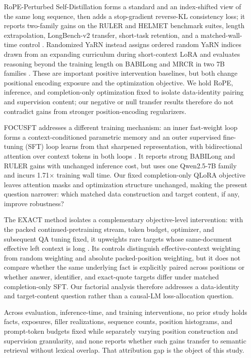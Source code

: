 \documentclass[11pt]{article}
\begin{document}
RoPE-Perturbed Self-Distillation forms a standard and an index-shifted view of the same long sequence, then adds a stop-gradient reverse-KL consistency loss; it reports two-family gains on the RULER and HELMET benchmark suites, length extrapolation, LongBench-v2 transfer, short-task retention, and a matched-wall-time control \citep{li2026shuffle}. Randomized YaRN instead assigns ordered random YaRN indices drawn from an expanding curriculum during short-context LoRA and evaluates reasoning beyond the training length on BABILong and MRCR in two 7B families \citep{mehta2026randomized}. These are important positive intervention baselines, but both change positional encoding exposure and the optimization objective. We hold RoPE, inference, and completion-only optimization fixed to isolate data-identity pairing and supervision content; our negative or null transfer results therefore do not contradict gains from stronger position-encoding regularizers.

FOCUSFT addresses a different training mechanism: an inner fast-weight loop forms a context-conditioned parametric memory and an outer supervised fine-tuning (SFT) loop learns from that sharpened representation, with bidirectional attention over context tokens in both loops \citep{pei2026focusft}. It reports strong BABILong and RULER gains with unchanged inference cost, but uses one Qwen2.5-7B family and incurs 1.71$\times$ training wall time. Our fixed completion-only QLoRA objective leaves attention masks and optimization structure unchanged, making the present question narrower: which matched data construction and target content, if any, improve robustness?

The EXACT method isolates a complementary objective-level intervention: with the packed continued-pretraining stream, token budget, optimizer, and subsequent QA tuning fixed, it upweights rare targets whose same-document effective left context is long \citep{zhu2026exact}. Its controls distinguish effective-context weighting from random weighting and absolute packed-position weighting, but it does not compare whether the same underlying fact is explicitly paired across positions or whether answer, identifier, and exact-quote targets differ under matched completion-only SFT. Our factorial analysis therefore addresses a data-identity and target-content question rather than a causal-LM loss-allocation question.

Across evaluation, inference-time, and training interventions, no prior study holds facts, exposures, filler realizations, sequence counts, position histograms, and prompt-token budgets fixed while separately varying position construction and supervision granularity, and none reports whether such gains transfer to semantic retrieval without lexical overlap. That attribution gap is the object of this study.
\end{document}
